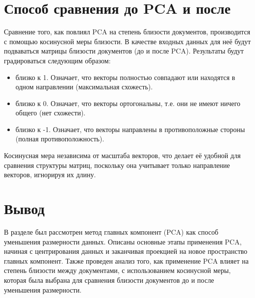 \section{Способ сравнения до PCA и после}

Сравнение того, как повлиял PCA на степень близости документов, производится с помощью косинусной меры близости. 
В качестве входных данных для неё будут подваваться матрицы близости документов (до и после PCA). Результаты будут градироваться следующим образом:
\begin{itemize}
    \item близко к 1. Означает, что векторы полностью совпадают или находятся в одном направлении (максимальная схожесть). 
    \item близко к 0. Означает, что векторы ортогональны, т.е. они не имеют ничего общего (нет схожести).
    \item близко к -1. Означает, что векторы направлены в противоположные стороны (полная противоположность).
\end{itemize} 

Косинусная мера независима от масштаба векторов, что делает её удобной для сравнения структуры матриц, поскольку она учитывает только направление векторов, игнорируя их длину. 

\section*{Вывод}

В разделе был рассмотрен метод главных компонент (PCA) как способ уменьшения размерности данных. 
Описаны основные этапы применения PCA, начиная с центрирования данных и заканчивая проекцией на новое пространство главных компонент. 
Также проведен анализ того, как применение PCA влияет на степень близости между документами, с использованием косинусной меры, 
которая была выбрана для сравнения близости документов до и после уменьшения размерности.

\clearpage

